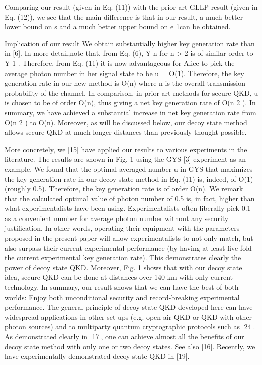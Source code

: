 Comparing our result (given in Eq. (11)) with the prior art GLLP result (given in Eq. (12)), we see that the main difference is that in our result, a much better lower bound on s and a much better upper bound on e 1can be obtained.

Implication of our result We obtain substantially higher key generation rate than in [6]. In more detail,note that, from Eq. (6), Y n for n > 2 is of similar order to Y 1 . Therefore, from Eq. (11) it is now advantageous for Alice to pick the average photon number in her signal state to be u = O(1). Therefore, the key generation rate in our new method is O(n) where n is the overall transmission probability of the channel. In comparison, in prior art methods for secure QKD, u is chosen to be of order O(n), thus giving a net key generation rate of O(n 2 ).
In summary, we have achieved a substantial increase in net key generation rate from O(n 2 ) to O(n). Moreover, as will be discussed below, our decoy state method allows secure QKD at much longer distances than previously thought possible.

More concretely, we [15] have applied our results to various experiments in the literature. The results are shown in Fig. 1 using the GYS [3] experiment as an example. We found that the optimal averaged number u in GYS that maximizes the key generation rate in our decoy state method in Eq. (11) is, indeed, of O(1) (roughly 0.5). Therefore, the key generation rate is of order O(n). We remark that the calculated optimal value of photon number of 0.5 is, in fact, higher than what experimentalists have been using. Experimentalists often liberally pick 0.1 as a convenient number for average photon number without any security justification. In other words, operating their equipment with the parameters proposed in the present paper will allow experimentalists to not only match, but also surpass their current experimental performance (by having at least five-fold the current experimental key generation rate). This demonstrates clearly the power of decoy state QKD. Moreover, Fig. 1 shows that with our decoy state idea, secure QKD can be done at distances over 140 km with only current technology. In summary, our result shows that we can have the best of both worlds: Enjoy both unconditional security and record-breaking experimental performance. The general principle of decoy state QKD developed here can have widespread applications in other set-ups (e.g. open-air QKD or QKD with other photon sources) and to multiparty quantum cryptographic protocols such as [24]. As demonstrated clearly in [17], one can achieve almost all the benefits of our decoy state method with only one or two decoy states. See also [16]. Recently, we have experimentally demonstrated decoy state QKD in [19].

